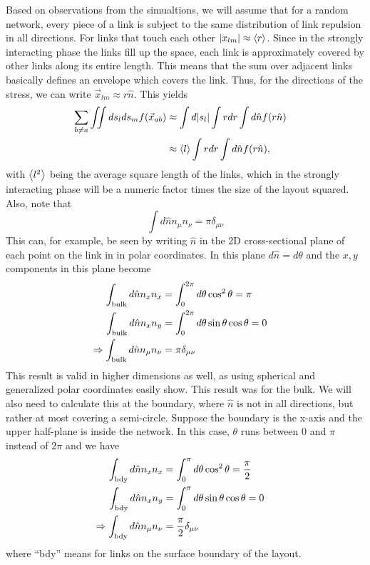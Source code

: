 \documentclass[nofootinbib,preprint,floatfix,titlepage,superscriptaddress]{revtex4} %
\begin{document}
Based on observations from the simualtions, we will assume that for a random network, every piece of a link is subject to the same distribution of link repulsion in all directions. 
For links that touch each other $|x_{lm}| \approx \left<r\right>$. 
Since in the strongly interacting phase the links fill up the space, each link is approximately covered by other links along its entire length. This means that the sum over adjacent links basically defines an envelope which covers the link.
Thus, for the directions of the stress,  we can write $\vec{x}_{lm} \approx  r\hat{n}$. 
This yields 
\begin{align}
    \sum_{b\ne a} \iint ds_lds_m f(\vec{x}_{ab}) &  \approx \int d|s_l| \int r dr \int d\hat{n} f(r\hat{n})\cr 
    & \approx  \left<l\right>\int rdr\int d\hat{n} f(r\hat{n}),
    \label{eq:apr-int}
\end{align}
with $\left<l^2\right>$ being the average square length of the links, which in the strongly interacting phase will be a numeric factor times the size of the layout squared. 
Also, note that 
\begin{equation}
\int d\hat{n} n_\mu n_\nu =\pi \delta_{\mu\nu} 
\end{equation}
This can, for example, be seen by writing $\hat{n}$ in the 2D cross-sectional plane of each point on the link in 
in polar coordinates. 
In this plane $d\hat{n} = d\theta $ and  the $x,y$ components in this plane become
\begin{align}
    \int_\mathrm{bulk} d\hat{n} n_x n_x & = 
    \int_0^{2\pi} d\theta \cos^2 \theta = \pi \cr
    \int_\mathrm{bulk} d\hat{n} n_x n_y & = \int_0^{2\pi} d\theta \sin \theta \cos \theta = 0 \cr 
    \Rightarrow  \int_\mathrm{bulk} d\hat{n} n_\mu n_\nu & = \pi \delta_{\mu\nu} 
    \label{eq:nhat-bulk}
\end{align}
This result is valid in higher dimensions as well, as using spherical and generalized polar coordinates easily show. 
This result was for the bulk.
We will also need to calculate this at the boundary, where $\hat{n} $ is not in all directions, but rather at most covering a semi-circle. 
Suppose the boundary is the x-axis and the upper half-plane is inside the network.
In this case, $\theta$ runs between $0$ and $\pi$ instead of $2\pi$ and we have 
\begin{align}
    \int_\mathrm{bdy} d\hat{n} n_x n_x & = 
    \int_0^\pi d\theta \cos^2 \theta = {\pi\over 2}  \cr
    \int_\mathrm{bdy} d\hat{n} n_x n_y & = \int_0^\pi d\theta \sin \theta \cos \theta = 0 \cr 
    \Rightarrow  \int_\mathrm{bdy} d\hat{n} n_\mu n_\nu & = {\pi\over 2} \delta_{\mu\nu} 
    \label{eq:nhat-bdy}
\end{align}
where ``bdy'' means for links on the surface boundary of the layout. 
\end{document}
